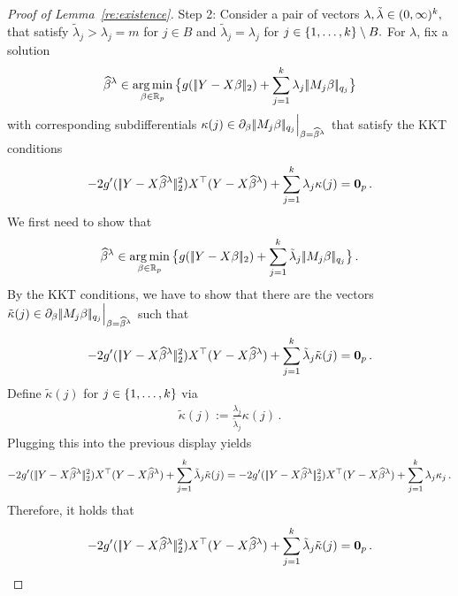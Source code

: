 \documentclass[bj]{imsart}
\newcommand{\normtwo}[1]{\ensuremath{\!|\!| #1 | \! |_{2}}}
\newcommand{\normqj}[1]{\ensuremath{\!|\!| #1 | \! |_{q_j}}}
\newcommand{\1}{{\rm 1}\mskip -4,5mu{\rm l} }
\newcommand{\argmin}{\mathop{\mathrm{arg\,min}}}
\def\R{\mathbb{R}}
\begin{document}
\begin{proof}[Proof of Lemma~\ref{re:existence}]
Step 2: 
Consider a pair of vectors $\lambda, \tilde \lambda\in (0,\infty)^{k},$ that satisfy $\tilde \lambda_j> \lambda_j=m$ for $j\in B$ and $\tilde\lambda_j=\lambda_j$ for $j\in \{1,\dots,k\}\setminus B.$
For $\lambda$, fix a solution
\begin{equation*}
\estimatort\in \argmin_{\beta\in\R_p} \big\{ g(\,\normtwo{\outcome-\design\beta})+\sum_{j=1}^\numbergroups\lambda_j\,\normqj{\fusedmatrix_j\beta}\big\}
\end{equation*}
with corresponding subdifferentials $\kappa(j)\in\partial_{\beta} \,\normqj{\fusedmatrix_j\beta}\Big|_{\beta=\estimatort}$ that satisfy the KKT conditions
\begin{align*}
-2g'(\,\normtwo{\outcome-\design\estimatort}^2)\design^\top (\outcome-\design\estimatort)+\sum_{j=1}^\numbergroups \lambda_j \kappa(j)=\bold{0}_p\,.
\end{align*}
We first need to show that 
\begin{equation*}
\estimatort\in \argmin_{\beta\in\R_p} \big\{ g(\,\normtwo{\outcome-\design\beta})+\sum_{j=1}^\numbergroups\tilde\lambda_j\,\normqj{\fusedmatrix_j\beta}\big\}\,.
\end{equation*}
By the KKT conditions, we have to show that there are the vectors $\tilde\kappa(j)\in\partial_{\beta}\, \normqj{\fusedmatrix_j\beta}\Big|_{\beta=\estimatort}$ such that
\begin{align*}
-2g'(\,\normtwo{\outcome-\design\estimatort}^2)\design^\top (\outcome-\design\estimatort)+\sum_{j=1}^\numbergroups\tilde \lambda_j \tilde\kappa(j)=\bold{0}_p\,.
\end{align*}
Define $\tilde \kappa(j)$ for $j\in\{1,\dots,k\}$ via
\begin{align*}
\tilde\kappa(j):=\frac{\lambda_j}{\tilde \lambda_j}\kappa(j) \,.
\end{align*}
Plugging this into the previous display yields
\begin{align*}
-2g'(\,\normtwo{\outcome-\design\estimatort}^2)\design^\top (\outcome-\design\estimatort)+\sum_{j=1}^\numbergroups\tilde \lambda_j \tilde \kappa(j)=-2g'(\,\normtwo{\outcome-\design\estimatort}^2)\design^\top( \outcome-\design\estimatort)+\sum_{j=1}^\numbergroups\lambda_j \kappa_j\,.
\end{align*}
Therefore,  it holds that
\begin{align*}
-2g'(\,\normtwo{\outcome-\design\estimatort}^2)\design^\top (\outcome-\design\estimatort)+\sum_{j=1}^\numbergroups\tilde \lambda_j \tilde \kappa(j)=\bold{0}_p\,.

\end{align*}
\end{proof}
\end{document}
